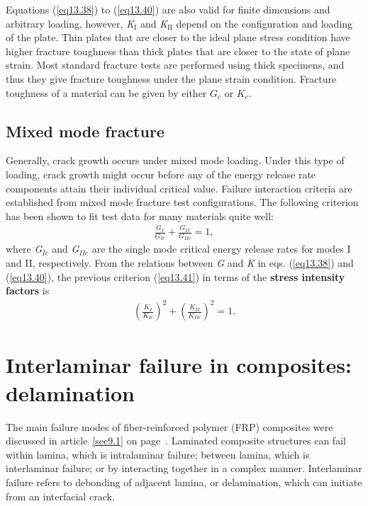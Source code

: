 \documentclass{AeroStructure-ERJohnson}
\begin{document}
Equations (\ref{eq13.38}) to (\ref{eq13.40}) are also valid for finite dimensions and arbitrary loading, however, \textit{K}$_\textrm{I}$ and \textit{K}$_\textrm{II}$ depend on the configuration and loading of the plate. Thin plates that are closer to the ideal plane stress condition have higher fracture toughness than thick plates that are closer to the state of plane strain. Most standard fracture tests are performed using thick specimens, and thus they give fracture toughness under the plane strain condition. Fracture toughness of a material can be given by either $G_{c}$ or $K_{c}$.

\subsection{Mixed mode fracture}\label{sec13.6.1}

Generally, crack growth occurs under mixed mode loading. Under this type of loading, crack growth might occur before any of the energy release rate components attain their individual critical value. Failure interaction criteria are established from mixed mode fracture test configurations. The following criterion has been shown to fit test data for many materials quite well:
\begin{align}\label{eq13.41}
\frac{G_{I}}{G_{I c}}+\frac{G_{I I}}{G_{I I c}}=1,
\end{align}
where \textit{G}$_\textit{Ic}$ and \textit{G}$_\textit{IIc}$ are the single mode critical energy release rates for modes I and II, respectively. From the relations between \textit{G} and \textit{K} in eqs. (\ref{eq13.38}) and (\ref{eq13.40}), the previous criterion (\ref{eq13.41}) in terms of the \textbf{stress intensity factors }is
\begin{align}\label{eq13.42}
\left(\frac{K_{I}}{K_{\textit{Ic}}}\right)^{2}+\left(\frac{K_{I I}}{K_{\textit{IIc}}}\right)^{2}=1.
\end{align}

\vspace*{-1pc}

\section{Interlaminar failure in composites: delamination}\label{sec13.7}

The main failure modes of fiber-reinforced polymer (FRP) composites were discussed in article~\ref{sec9.1} on page~\pageref{sec9.1}. Laminated composite structures can fail within lamina, which is intralaminar failure; between lamina, which is interlaminar failure; or by interacting together in a complex manner. Interlaminar failure refers to debonding of adjacent lamina, or delamination, which can initiate from an interfacial crack.
\end{document}
